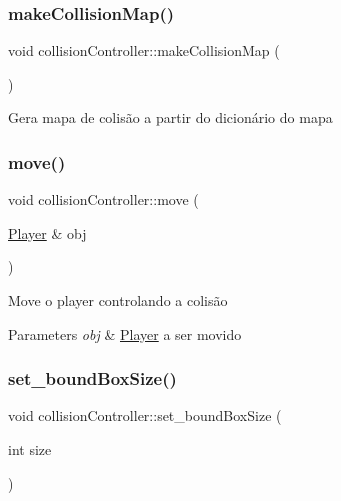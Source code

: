 \subsubsection{\texorpdfstring{make\+Collision\+Map()}{makeCollisionMap()}}
{\footnotesize\ttfamily void collision\+Controller\+::make\+Collision\+Map (\begin{DoxyParamCaption}{ }\end{DoxyParamCaption})}

Gera mapa de colisão a partir do dicionário do mapa \mbox{\label{classcollisionController_ad08a8b7f1bc6f803a8875a89ac194bba}} 
\subsubsection{\texorpdfstring{move()}{move()}}
{\footnotesize\ttfamily void collision\+Controller\+::move (\begin{DoxyParamCaption}\item[{\hyperlink{classPlayer}{Player} \&}]{obj }\end{DoxyParamCaption})}

Move o player controlando a colisão 
\begin{DoxyParams}{Parameters}
{\em obj} & \hyperlink{classPlayer}{Player} a ser movido \\
\hline
\end{DoxyParams}
\mbox{\label{classcollisionController_a0b59127f63d5caeeb5fa3c573853c8e7}} 
\subsubsection{\texorpdfstring{set\+\_\+bound\+Box\+Size()}{set\_boundBoxSize()}}
{\footnotesize\ttfamily void collision\+Controller\+::set\+\_\+bound\+Box\+Size (\begin{DoxyParamCaption}\item[{int}]{size }\end{DoxyParamCaption})}

\mbox{\label{classcollisionController_aee7db17044f602c0b8a553012540480b}} 

